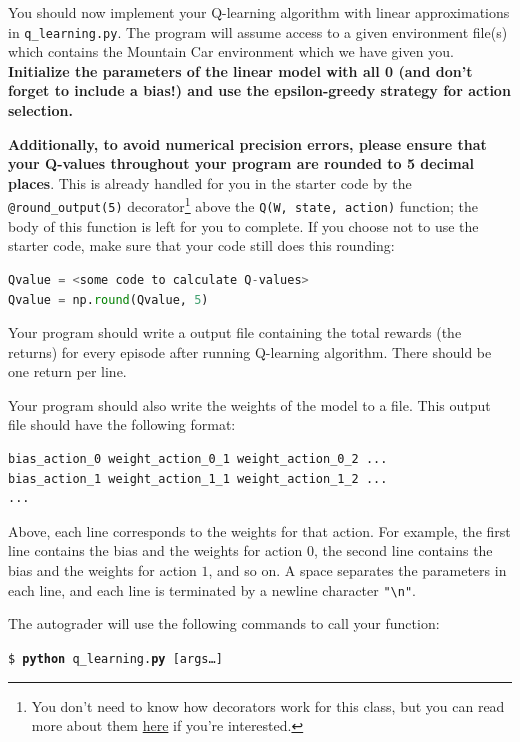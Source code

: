 \documentclass[11pt,addpoints,answers]{exam}
\begin{document}
You should now implement your Q-learning algorithm with linear approximations in \texttt{q\_learning.py}. The program will assume access to a given environment file(s) which contains the Mountain Car environment which we have given you.  \textbf{Initialize the parameters of the linear model with all 0 (and don't forget to include a bias!) and use the epsilon-greedy strategy for action selection.}

\textbf{Additionally, to avoid numerical precision errors, please ensure that your Q-values throughout your program are rounded to 5 decimal places}. This is already handled for you in the starter code by the \texttt{@round\_output(5)} decorator\footnote{You don't need to know how decorators work for this class, but you can read more about them \href{https://realpython.com/primer-on-python-decorators/}{here} if you're interested.} above the \texttt{Q(W, state, action)} function; the body of this function is left for you to complete. If you choose not to use the starter code, make sure that your code still does this rounding:
\begin{lstlisting}[language=Python]
Qvalue = <some code to calculate Q-values>
Qvalue = np.round(Qvalue, 5)
\end{lstlisting}

Your program should write a output file containing the total rewards (the returns) for every episode after running Q-learning algorithm. There should be one return per line.

Your program should also write the weights of the model to a file. This output file should have the following format:
\begin{lstlisting}
bias_action_0 weight_action_0_1 weight_action_0_2 ...
bias_action_1 weight_action_1_1 weight_action_1_2 ...
...
\end{lstlisting}

Above, each line corresponds to the weights for that action. For example, the first line contains the bias and the weights for action $0$, the second line contains the bias and the weights for action $1$, and so on. A space separates the parameters in each line, and each line is terminated by a newline character \texttt{"\textbackslash n"}.

The autograder will use the following commands to call your function:

\begin{tabbing}
\=\texttt{\$ \textbf{python} q\_learning.\textbf{py} [args\dots]}
\end{tabbing}
\end{document}
